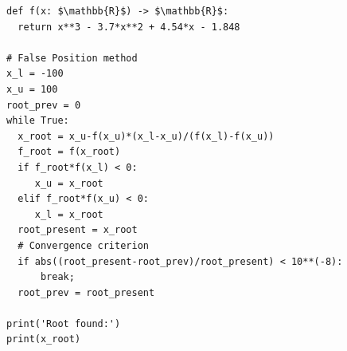 \documentclass[border=10pt]{standalone}
\begin{document}
\begin{lstlisting}
def f(x: $\mathbb{R}$) -> $\mathbb{R}$:                                      
  return x**3 - 3.7*x**2 + 4.54*x - 1.848              
                                                       
# False Position method                                
x_l = -100                                             
x_u = 100                                              
root_prev = 0                                          
while True:                                            
  x_root = x_u-f(x_u)*(x_l-x_u)/(f(x_l)-f(x_u))        
  f_root = f(x_root)                                   
  if f_root*f(x_l) < 0:                                
     x_u = x_root                                      
  elif f_root*f(x_u) < 0:                              
     x_l = x_root                                      
  root_present = x_root                                
  # Convergence criterion                              
  if abs((root_present-root_prev)/root_present) < 10**(-8):
      break;                                           
  root_prev = root_present                             
  
print('Root found:')                                   
print(x_root)
\end{lstlisting}
\end{document}
